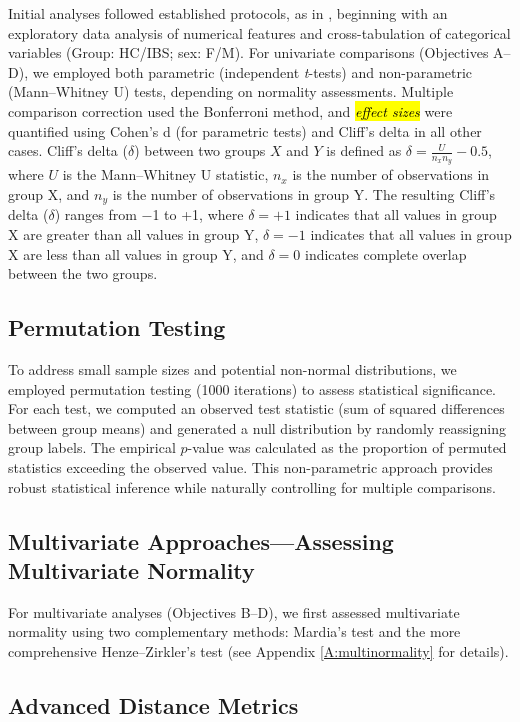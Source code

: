 \documentclass[diagnostics,article,accept,pdftex,moreauthors]{Definitions/mdpi}
\begin{document}
Initial analyses followed established protocols, as in \cite{Skrobisz2022}, beginning with an exploratory data analysis of numerical features and cross-tabulation of categorical variables (Group: HC/IBS; sex: F/M). For univariate comparisons (Objectives A--D), we employed both parametric (independent \emph{t}-tests) and non-parametric (Mann--Whitney U) tests, depending on normality assessments. Multiple comparison correction used the Bonferroni method, and \textit{\hl{effect sizes}} 
were quantified using Cohen's d (for parametric tests) and Cliff's delta \cite{cliff1993dominance} in all other cases. Cliff's delta ($\delta$) between two groups $X$ and $Y$ is defined as $\delta = \frac{U}{n_x n_y} - 0.5$, where $U$ is the Mann--Whitney U statistic, $n_x$ is the number of observations in group X, and $n_y$ is the number of observations in group Y. The resulting Cliff's delta ($\delta$) ranges from $-$1 to +1, where $\delta = +1$ indicates that all values in group X are greater than all values in group Y, $\delta = -1$ indicates that all values in group X are less than all values in group Y, and $\delta = 0$ indicates complete overlap between the two groups. 


\subsection{Permutation Testing}
To address small sample sizes and potential non-normal distributions, we employed permutation testing (1000 iterations) to assess statistical significance. For each test, we computed an observed test statistic (sum of squared differences between group means) and generated a null distribution by randomly reassigning group labels. The empirical $p$-value was calculated as the proportion of permuted statistics exceeding the observed value. This non-parametric approach provides robust statistical inference while naturally controlling for multiple comparisons.


\subsection{Multivariate Approaches---Assessing Multivariate Normality}

For multivariate analyses (Objectives B--D), we first assessed multivariate normality using two complementary methods: Mardia's test and the more comprehensive Henze--Zirkler's test (see Appendix \ref{A:multinormality} for details).

\subsection{Advanced Distance Metrics}
\end{document}
